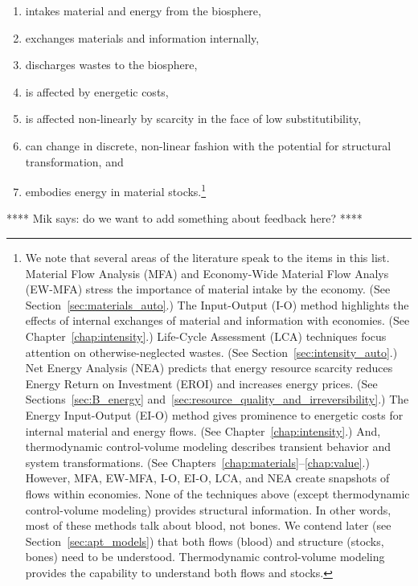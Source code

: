 \begin{enumerate}
	\item{intakes material and energy from the biosphere,}
	\item{exchanges materials and information internally,}
	\item{discharges wastes to the biosphere,}
	\item{is affected by energetic costs,}
	\item{is affected non-linearly by scarcity in the face of low substitutibility,}
	\item{can change in discrete, non-linear fashion with the potential 
			for structural transformation, and}
	\item{embodies energy in material stocks.\footnote{We note that 
			several areas of the literature speak to the items in this list.
			Material Flow Analysis (MFA) and 
			Economy-Wide Material Flow Analys (EW-MFA)
			stress the importance of
			material intake by the economy. 
			(See Section~\ref{sec:materials_auto}.)
			The Input-Output (I-O) method highlights the effects of internal exchanges
			of material and information with economies. 
			(See Chapter~\ref{chap:intensity}.)
			Life-Cycle Assessment (LCA) techniques focus attention 
			on otherwise-neglected wastes. 
			(See Section~\ref{sec:intensity_auto}.)
			Net Energy Analysis (NEA) predicts that energy resource 
			scarcity reduces Energy Return on Investment (EROI)
			and increases energy prices.
			(See Sections~\ref{sec:B_energy} 
			and~\ref{sec:resource_quality_and_irreversibility}.)
			The Energy Input-Output (EI-O) method gives prominence to energetic costs
			for internal material and energy flows.
			(See Chapter~\ref{chap:intensity}.)
			And, thermodynamic control-volume modeling describes
			transient behavior and system transformations.
			(See Chapters~\ref{chap:materials}--\ref{chap:value}.)
			However, MFA, EW-MFA, I-O, EI-O, LCA, and NEA create snapshots 
			of flows within economies. 
			None of the techniques above (except thermodynamic control-volume modeling) 
			provides structural information. 
			In other words, most of these methods talk about blood, not bones. 
			We contend later (see Section~\ref{sec:apt_models}) that both flows (blood) 
			and structure (stocks, bones) need to be understood.
			Thermodynamic control-volume modeling provides the capability 
			to understand both flows and stocks.}}
\end{enumerate}
**** Mik says: do we want to add something about feedback here? ****

